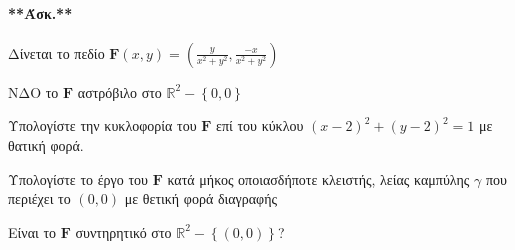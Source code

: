 \documentclass[11pt,a4paper,titlepage]{article}
\begin{document}
\paragraph{**Άσκ.**}
Δίνεται το πεδίο \( \mathbf{F}(x,y) = \left(
\frac{y}{x^2+y^2},\frac{-x}{x^2+y^2}
\right) \)
\begin{enumparen}
\item ΝΔΟ το \( \mathbf F \) αστρόβιλο στο \( \mathbb R ^2 - \left\lbrace 0,0 \right\rbrace \)
\item Υπολογίστε την κυκλοφορία του \( \mathbf F \) επί του κύκλου \( (x-2)^2+(y-2)^2=1 \) με θατική φορά.
\item Υπολογίστε το έργο του \( \mathbf F \) κατά μήκος οποιασδήποτε κλειστής, λείας καμπύλης \( \gamma \) που περιέχει το \( (0,0) \) με θετική φορά διαγραφής
\item Είναι το \( \mathbf F \) συντηρητικό στο \( \mathbb R ^2 - \left\lbrace (0,0) \right\rbrace \)?
\end{enumparen}
\end{document}
